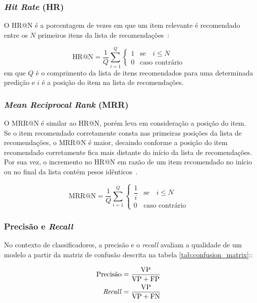   \subsubsection{\textit{Hit Rate} (HR)}
  O HR@N é a porcentagem de vezes em que um item relevante
  é recomendado entre os $N$ primeiros itens da lista de recomendações~\cite{sessionbaseddp}:

  \begin{equation}
    \text{HR@N} = \frac{1}{Q}\sum_{i=1}^{Q}\begin{cases}
      1 & \text{se} \quad i \leq N \\
      0 & \text{caso contrário}
    \end{cases}
  \end{equation}
  em que $Q$ é o comprimento da lista de itens recomendados para uma determinada
  predição e $i$ é a posição do item na lista de recomendações.
  \subsubsection{\textit{Mean Reciprocal Rank} (MRR)} O MRR@N é similar ao HR@N,
  porém leva em consideração a posição do item. Se o item recomendado
  corretamente consta nas primeiras posições da lista de recomendações, o MRR@N
  é maior, decaindo conforme a posição do item recomendado corretamente fica
  mais distante do início da lista de recomendações. Por sua vez, o incremento
  no HR@N em razão de um item recomendado no início ou no final da lista contém
  pesos idênticos~\cite{sessionbaseddp}.

  \begin{equation}
    \text{MRR@N} = \frac{1}{Q}\sum_{i=1}^{Q}\begin{cases}
      \dfrac{1}{i} & \text{se} \quad i \leq N \\
      0 & \text{caso contrário}
    \end{cases}
  \end{equation}

  \subsubsection{Precisão e \textit{Recall}}
  No contexto de classificadores, a precisão e o \textit{recall} avaliam
  a qualidade de um modelo a partir da matriz de confusão descrita
  na tabela \ref{tab:confusion_matrix}::

  \begin{align}
    \text{Precisão} &= \frac{\text{VP}}{\text{VP} + \text{FP}} \\
    \text{\textit{Recall}} &= \frac{\text{VP}}{\text{VP} + \text{FN}}
  \end{align}


